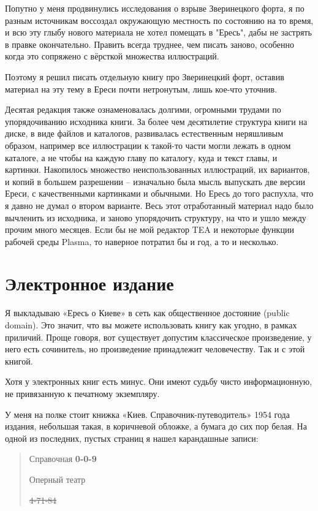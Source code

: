 Попутно у меня продвинулись исследования о взрыве Зверинецкого форта, я по разным источникам воссоздал окружающую местность по состоянию на то время, и всю эту глыбу нового материала не хотел помещать в "Ересь", дабы не застрять в правке окончательно. Править всегда труднее, чем писать заново, особенно когда это сопряжено с вёрсткой множества иллюстраций.

Поэтому я решил писать отдельную книгу про Зверинецкий форт, оставив материал на эту тему в Ереси почти нетронутым, лишь кое-что уточнив.

Десятая редакция также ознаменовалась долгими, огромными трудами по упорядочиванию исходника книги. За более чем десятилетие структура книги на диске, в виде файлов и каталогов, развивалась естественным неряшливым образом, например все иллюстрации к такой-то части могли лежать в одном каталоге, а не чтобы на каждую главу по каталогу, куда и текст главы, и картинки. Накопилось множество неиспользованных иллюстраций, их вариантов, и копий в большем разрешении – изначально была мысль выпускать две версии Ереси, с качественными картинками и обычными. Но Ересь до того распухла, что я давно не думал о втором варианте. Весь этот отработанный материал надо было вычленить из исходника, и заново упорядочить структуру, на что и ушло между прочим много месяцев. Если бы не мой редактор TEA и некоторые функции рабочей среды Plasma, то наверное потратил бы и год, а то и несколько.


\section*{Электронное издание} 

Я выкладываю «Ересь о Киеве» в сеть как общественное достояние (public domain). Это значит, что вы можете использовать книгу как угодно, в рамках приличий. Проще говоря, вот существует допустим классическое произведение, у него есть сочинитель, но произведение принадлежит человечеству. Так и с этой книгой.

Хотя у электронных книг есть минус. Они имеют судьбу чисто информационную, не привязанную к печатному экземпляру.

У меня на полке стоит книжка «Киев. Справочник-пут\-еводи\-тель» 1954 года издания, небольшая такая, в коричневой обложке, а бумага до сих пор белая. На одной из последних, пустых страниц я нашел карандашные записи:

\begin{quotation}
Справочная \textbf{0-0-9}

Оперный театр

\sout{4-71-84}
\end{quotation}

